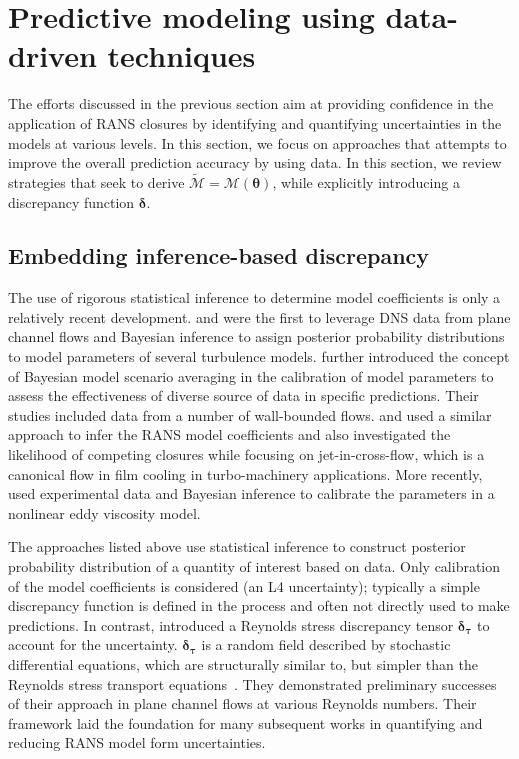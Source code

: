 \documentclass[a4paper]{ar-1col}
\begin{document}
\section{Predictive modeling using data-driven techniques}

The efforts discussed in the previous section aim at providing confidence in the application of RANS closures by identifying and quantifying  uncertainties in the models at various levels. In this section, we focus on approaches that attempts to improve the overall prediction accuracy by using data. In this section, we review strategies that seek to derive $  \widetilde{ \mathcal M} = \mathcal M (\bm{\theta}) $, while explicitly introducing a discrepancy function $\bm{\delta}$.


\subsection{Embedding inference-based discrepancy}

The use of rigorous statistical inference to determine model coefficients is only a relatively recent development.
\citet{oliver2011bayesian} and \citet{cheung2011bayesian} were the first to leverage DNS data from plane channel flows and Bayesian inference  to assign posterior probability distributions to model parameters of several  turbulence models. \citet{edeling2014bayesian,edeling2014predictive} further introduced the concept of Bayesian model scenario averaging in the calibration of model parameters to assess the effectiveness of diverse source of data in specific predictions. Their studies included data from a number of wall-bounded flows.
 \cite{lefantzi2015estimation} and \citet{ray2016bayesian} used a similar approach to infer the RANS model coefficients and also investigated  the likelihood of competing closures while  focusing  on  jet-in-cross-flow, which is a canonical flow in film cooling in turbo-machinery applications. More recently,
\citet{ray2018learning} used experimental data and Bayesian inference to calibrate the parameters in a nonlinear eddy viscosity model.

The approaches listed above use statistical inference to construct posterior probability distribution of a quantity of interest based on data. Only calibration of the model coefficients is considered (an L4 uncertainty); typically a simple discrepancy function is defined in the process and often not directly used to make predictions.  
In contrast,  \citet{oliver2009uncertainty}  introduced a Reynolds stress discrepancy tensor
$\bm{\delta}_{\bm{\tau}}$ to account for the uncertainty.  $\bm{\delta}_{\bm{\tau}}$ is a random field described by stochastic differential
equations, which are structurally similar to, but simpler than the Reynolds stress transport equations~\citep[e.g.,][]{launder1975progress}.  They demonstrated preliminary successes of their approach in plane channel flows at various Reynolds numbers. Their framework laid the foundation for many subsequent works in quantifying and reducing RANS model form uncertainties.
 
\end{document}

